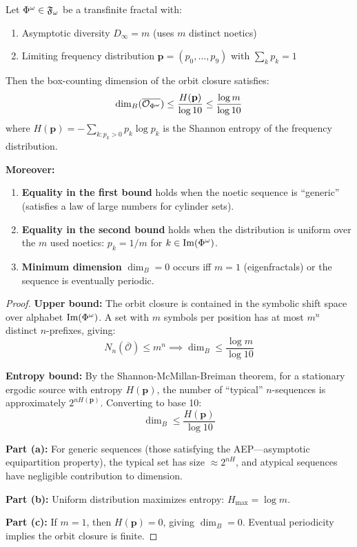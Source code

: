 \begin{theorem}
\label{thm:noetic-dimension-main}
Let $\Phi^{\omega} \in \mathfrak{F}_\omega$ be a transfinite fractal with:
\begin{enumerate}[label=(\roman*)]
  \item Asymptotic diversity $D_\infty = m$ (uses $m$ distinct noetics)
  \item Limiting frequency distribution $\mathbf{p} = (p_0, \ldots, p_9)$ with $\sum_k p_k = 1$
\end{enumerate}

Then the box-counting dimension of the orbit closure satisfies:
\[
\dim_B(\overline{\mathcal{O}_{\Phi^{\omega}}}) \leq \frac{H(\mathbf{p})}{\log 10} \leq \frac{\log m}{\log 10}
\]
where $H(\mathbf{p}) = -\sum_{k : p_k > 0} p_k \log p_k$ is the Shannon entropy of the frequency distribution.

\textbf{Moreover:}
\begin{enumerate}[label=(\alph*)]
  \item \textbf{Equality in the first bound} holds when the noetic sequence is ``generic'' (satisfies a law of large numbers for cylinder sets).
  \item \textbf{Equality in the second bound} holds when the distribution is uniform over the $m$ used noetics: $p_k = 1/m$ for $k \in \mathrm{Im}(\Phi^{\omega})$.
  \item \textbf{Minimum dimension} $\dim_B = 0$ occurs iff $m = 1$ (eigenfractals) or the sequence is eventually periodic.
\end{enumerate}
\end{theorem}

\begin{proof}
\textbf{Upper bound:} The orbit closure is contained in the symbolic shift space over alphabet $\mathrm{Im}(\Phi^{\omega})$. A set with $m$ symbols per position has at most $m^n$ distinct $n$-prefixes, giving:
\[
N_n(\overline{\mathcal{O}}) \leq m^n \implies \dim_B \leq \frac{\log m}{\log 10}
\]

\textbf{Entropy bound:} By the Shannon-McMillan-Breiman theorem, for a stationary ergodic source with entropy $H(\mathbf{p})$, the number of ``typical'' $n$-sequences is approximately $2^{nH(\mathbf{p})}$. Converting to base 10:
\[
\dim_B \leq \frac{H(\mathbf{p})}{\log 10}
\]

\textbf{Part (a):} For generic sequences (those satisfying the AEP---asymptotic equipartition property), the typical set has size $\approx 2^{nH}$, and atypical sequences have negligible contribution to dimension.

\textbf{Part (b):} Uniform distribution maximizes entropy: $H_{\max} = \log m$.

\textbf{Part (c):} If $m = 1$, then $H(\mathbf{p}) = 0$, giving $\dim_B = 0$. Eventual periodicity implies the orbit closure is finite.
\end{proof}

